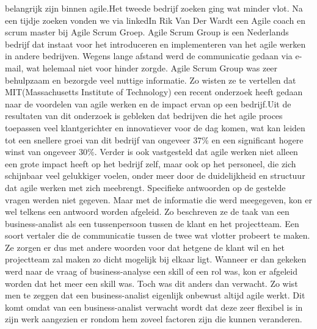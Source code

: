 \documentclass{hogent-article}
\begin{document}
belangrijk zijn binnen agile.\newline \newline Het tweede bedrijf zoeken ging wat minder vlot. Na een tijdje zoeken vonden we via linkedIn Rik Van Der Wardt een Agile coach en scrum master bij Agile Scrum Groep. Agile Scrum Group is een Nederlands bedrijf dat instaat voor het introduceren en implementeren van het agile werken in andere bedrijven. Wegens lange afstand werd de communicatie gedaan via e-mail, wat helemaal niet voor hinder zorgde. Agile Scrum Group was zeer behulpzaam en bezorgde veel nuttige informatie. Zo wisten ze te vertellen dat MIT(Massachusetts Institute of Technology) een recent onderzoek heeft gedaan naar de voordelen van agile werken en de impact ervan op een bedrijf.\newline \newline Uit de resultaten van dit onderzoek is gebleken dat bedrijven die het agile proces toepassen veel klantgerichter en innovatiever voor de dag komen, wat kan leiden tot een snellere groei van dit bedrijf van ongeveer 37\% en een significant hogere winst van ongeveer 30\%. \newline
\newline
Verder is ook vastgesteld dat agile werken niet alleen een grote impact heeft op het bedrijf zelf, maar ook op het personeel, die zich schijnbaar veel gelukkiger voelen, onder meer door de duidelijkheid en structuur dat agile werken met zich meebrengt.\newline
Specifieke antwoorden op de gestelde vragen werden niet gegeven. Maar met de informatie die werd meegegeven, kon er wel telkens een antwoord worden afgeleid. Zo beschreven ze de taak van een business-analist als een tussenpersoon tussen de klant en het projectteam. Een soort vertaler die de communicatie tussen de twee wat vlotter probeert te maken. Ze zorgen er dus met andere woorden voor dat hetgene de klant wil en het projectteam zal maken zo dicht mogelijk bij elkaar ligt. \newline
\newline
Wanneer er dan gekeken werd naar de vraag of business-analyse een skill of een rol was, kon er afgeleid worden dat het meer een skill was. Toch was dit anders dan verwacht. Zo wist men te zeggen dat een business-analist eigenlijk onbewust altijd agile werkt. Dit komt omdat van een business-analist verwacht wordt dat deze zeer flexibel is in zijn werk aangezien er rondom hem zoveel factoren zijn die kunnen veranderen.\newline
\newline
\end{document}
